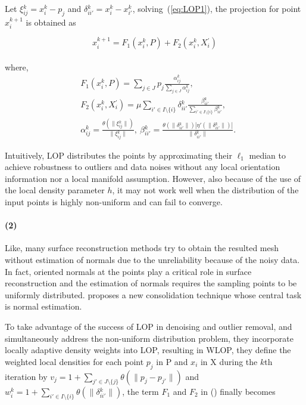 Let $\xi{_{ij}^k}=x{_i^k}-p_{j}$ and $\delta{_{ii'}^k}=x{_i^k}-x{_{i'}^k}$, solving~(\ref{eq:LOP1}), the projection for point $x{_i^{k+1}}$ is obtained as

\small{
\begin{equation}
 \label{eq:LOP3}
 x{_i^{k+1}}=F_1(x{_i^k},P)+F_2(x{_i^k},X{_i^{'}})
\end{equation}
}
\\
where,
\small{
\begin{equation}
 \label{eq:LOP4}
 \begin{split}
 & F_1(x{_i^k},P)=\sum_{j\in J}^{}p_{j}\frac{\alpha{_{ij}^k}}{\sum_{j\in J}^{}\alpha{_{ij}^k}},\\
 & F_2(x{_i^k},X{_i^{'}})=\mu\sum_{{i'}\in I\setminus\{i\}}^{}\delta{_{ii'}^k}\frac{\beta{_{ii'}^k}}{\sum_{{i'}\in I\setminus\{i\}}^{}\beta{_{ii'}^k}},\\
 & \alpha{_{ij}^k}=\frac{\theta(\|\xi{_{ij}^k}\|)}{\|\xi{_{ij}^k}\|},
   ~\beta{_{ii'}^k}=\frac{\theta(\|\delta{_{ii'}^k}\|)|\eta'(\|\delta{_{ii'}^k}\|)|}{\|\delta{_{ii'}^k}\|}.
 \end{split}
\end{equation}
}

Intuitively, LOP distributes the points by approximating their $\ell_1$ median to achieve robustness to outliers and data noises without any local orientation information nor a local manifold assumption.
However, also because of the use of the local density parameter $h$, it may not work well when the distribution of the input points is highly non-uniform and can fail to converge.

\paragraph{(2)}

Like\cite{lipman2007parameterization}, many surface reconstruction methods try to obtain the resulted mesh without estimation of normals due to the unreliability because of the noisy data.
In fact, oriented normals at the points play a critical role in surface reconstruction and the estimation of normals requires the sampling points to be uniformly distributed.
\cite{huang2009consolidation} proposes a new consolidation technique whose central task is normal estimation.

To take advantage of the success of LOP in denoising and outlier removal, and simultaneously address the non-uniform distribution problem, they incorporate locally adaptive density weights into LOP, resulting in WLOP, they define the weighted local densities for each point $p_{j}$ in P and $x_{i}$ in X during the $k$th iteration by $v_{j}=1+\sum_{j'\in J\setminus\{j\}}^{}\theta(\|p_{j}-p_{j'}\|)$ and $w{_i^k}=1+\sum_{i'\in I\setminus\{i\}}^{}\theta(\|\delta{_{ii'}^k}\|)$, the term $F_1$ and $F_2$ in () finally becomes

